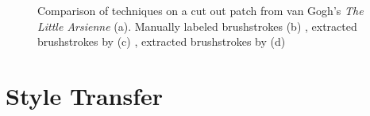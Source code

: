 \begin{figure}
    \qquad
    \qquad
    \qquad
    \caption[]{Comparison of techniques on a cut out patch from van Gogh's \textit{The Little Arsienne} (a). Manually labeled brushstrokes (b) \cite{rhythmic}, extracted brushstrokes by \citeauthor*{rhythmic} (c) \cite{rhythmic}, extracted brushstrokes by \citeauthor*{lamberti} (d) \cite{lamberti}}
\end{figure}


\section{Style Transfer}


